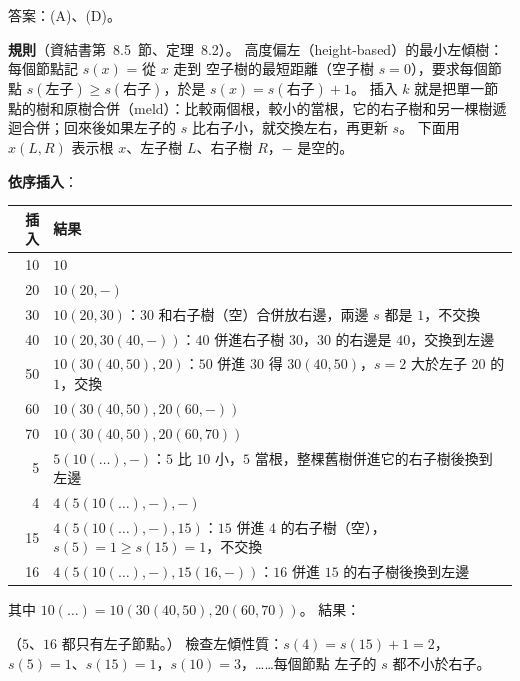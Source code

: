 \begin{pastsoln}
答案：(A)、(D)。

\textbf{規則}（資結書第~8.5~節、定理~8.2）。 高度偏左（height-based）的最小左傾樹：每個節點記 $s(x)$ = 從 $x$ 走到
空子樹的最短距離（空子樹 $s = 0$），要求每個節點 $s(\text{左子}) \ge s(\text{右子})$，於是 $s(x) = s(\text{右子}) + 1$。
插入 $k$ 就是把單一節點的樹和原樹合併（meld）：比較兩個根，較小的當根，它的右子樹和另一棵樹遞迴合併；回來後如果左子的
$s$ 比右子小，就交換左右，再更新 $s$。 下面用 $x(L, R)$ 表示根 $x$、左子樹 $L$、右子樹 $R$，$-$ 是空的。

\textbf{依序插入}：
\begin{center}
\small
\begin{tabular}{rl}
\toprule
插入 & 結果 \\
\midrule
10 & $10$ \\
20 & $10(20, -)$ \\
30 & $10(20, 30)$：$30$ 和右子樹（空）合併放右邊，兩邊 $s$ 都是 $1$，不交換 \\
40 & $10(20, 30(40, -))$：$40$ 併進右子樹 $30$，$30$ 的右邊是 $40$，交換到左邊 \\
50 & $10(30(40, 50), 20)$：$50$ 併進 $30$ 得 $30(40, 50)$，$s = 2$ 大於左子 $20$ 的 $1$，交換 \\
60 & $10(30(40, 50), 20(60, -))$ \\
70 & $10(30(40, 50), 20(60, 70))$ \\
5 & $5(10(\ldots), -)$：$5$ 比 $10$ 小，$5$ 當根，整棵舊樹併進它的右子樹後換到左邊 \\
4 & $4(5(10(\ldots), -), -)$ \\
15 & $4(5(10(\ldots), -), 15)$：$15$ 併進 $4$ 的右子樹（空），$s(5) = 1 \ge s(15) = 1$，不交換 \\
16 & $4(5(10(\ldots), -), 15(16, -))$：$16$ 併進 $15$ 的右子樹後換到左邊 \\
\bottomrule
\end{tabular}
\end{center}
其中 $10(\ldots) = 10(30(40, 50), 20(60, 70))$。 結果：
\begin{center}
\end{center}
（$5$、$16$ 都只有左子節點。） 檢查左傾性質：$s(4) = s(15) + 1 = 2$，$s(5) = 1$、$s(15) = 1$，$s(10) = 3$，……每個節點
左子的 $s$ 都不小於右子。


\end{pastsoln}
